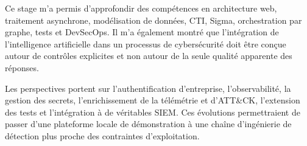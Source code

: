 Ce stage m'a permis d'approfondir des compétences en architecture web, traitement asynchrone, modélisation de données, CTI, Sigma, orchestration par graphe, tests et DevSecOps. Il m'a également montré que l'intégration de l'intelligence artificielle dans un processus de cybersécurité doit être conçue autour de contrôles explicites et non autour de la seule qualité apparente des réponses.

Les perspectives portent sur l'authentification d'entreprise, l'observabilité, la gestion des secrets, l'enrichissement de la télémétrie et d'ATT\&CK, l'extension des tests et l'intégration à de véritables SIEM. Ces évolutions permettraient de passer d'une plateforme locale de démonstration à une chaîne d'ingénierie de détection plus proche des contraintes d'exploitation.